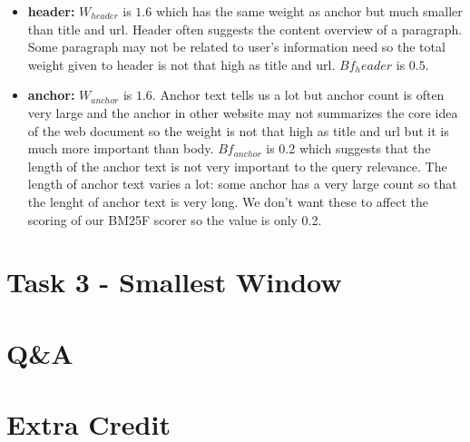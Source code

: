 \documentclass{article}
\begin{document}
\begin{itemize}
  \item \textbf{header:} $W_{header}$ is $1.6$ which has the same weight as anchor but much smaller than title and url. Header often suggests the content overview of a paragraph. Some paragraph may not be related to user's information need so the total weight given to header is not that high as title and url. $Bf_header$ is $0.5$.
  \item \textbf{anchor:} $W_{anchor}$ is $1.6$. Anchor text tells us a lot but anchor count is often very large and the anchor in other website may not summarizes the core idea of the web document so the weight is not that high as title and url but it is much more important than body. $Bf_{anchor}$ is 0.2 which suggests that the length of the anchor text is not very important to the query relevance. The length of anchor text varies a lot: some anchor has a very large count so that the lenght of anchor text is very long. We don't want these to affect the scoring of our BM25F scorer so the value is only 0.2.
\end{itemize}


\section{Task 3 - Smallest Window}

\section{Q\&A}

\section{Extra Credit}
\end{document}
